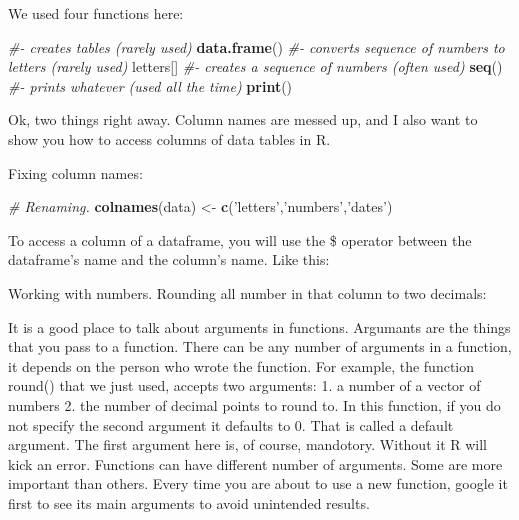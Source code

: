 \documentclass[]{book}
\newenvironment{Shaded}{\begin{snugshade}}{\end{snugshade}}
\newcommand{\CommentTok}[1]{\textcolor[rgb]{0.56,0.35,0.01}{\textit{#1}}}
\newcommand{\DecValTok}[1]{\textcolor[rgb]{0.00,0.00,0.81}{#1}}
\newcommand{\KeywordTok}[1]{\textcolor[rgb]{0.13,0.29,0.53}{\textbf{#1}}}
\newcommand{\NormalTok}[1]{#1}
\newcommand{\OperatorTok}[1]{\textcolor[rgb]{0.81,0.36,0.00}{\textbf{#1}}}
\newcommand{\StringTok}[1]{\textcolor[rgb]{0.31,0.60,0.02}{#1}}
\begin{document}
We used four functions here:

\begin{Shaded}
\begin{Highlighting}[]
\CommentTok{#- creates tables (rarely used)}
\KeywordTok{data.frame}\NormalTok{() }
\CommentTok{#- converts sequence of numbers to letters (rarely used)}
\NormalTok{letters[] }
\CommentTok{#- creates a sequence of numbers (often used)}
\KeywordTok{seq}\NormalTok{() }
\CommentTok{#- prints whatever (used all the time)}
\KeywordTok{print}\NormalTok{() }
\end{Highlighting}
\end{Shaded}

Ok, two things right away. Column names are messed up, and I also want to show you how to access columns of data tables in R.

Fixing column names:

\begin{Shaded}
\begin{Highlighting}[]
\CommentTok{# Renaming.}
\KeywordTok{colnames}\NormalTok{(data) <-}\StringTok{ }\KeywordTok{c}\NormalTok{(}\StringTok{'letters'}\NormalTok{,}\StringTok{'numbers'}\NormalTok{,}\StringTok{'dates'}\NormalTok{) }
\end{Highlighting}
\end{Shaded}

To access a column of a dataframe, you will use the \$ operator between the dataframe's name and the column's name. Like this:

\begin{Shaded}
\end{Shaded}

Working with numbers. Rounding all number in that column to two decimals:

\begin{Shaded}
\end{Shaded}

It is a good place to talk about arguments in functions. Argumants are the things that you pass to a function. There can be any number of arguments in a function, it depends on the person who wrote the function. For example, the function round() that we just used, accepts two arguments: 1. a number of a vector of numbers 2. the number of decimal points to round to. In this function, if you do not specify the second argument it defaults to 0. That is called a default argument. The first argument here is, of course, mandotory. Without it R will kick an error. Functions can have different number of arguments. Some are more important than others. Every time you are about to use a new function, google it first to see its main arguments to avoid unintended results.
\end{document}
